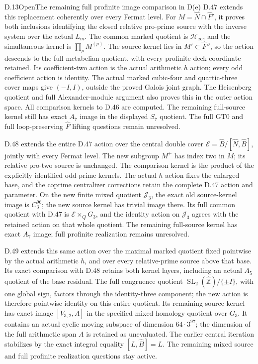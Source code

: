 \begin{statement}{D.13}{Open}{The remaining full profinite image comparison in D(e)}
D.47 extends this replacement coherently over every Fermat level.
For \(M=\widehat N\cap\widehat F'\), it proves both inclusions
identifying the closed relative pro-prime source with the inverse
system over the actual \(L_m\). The common marked quotient is
\(\mathcal H_\infty\), and the simultaneous kernel is
\(\prod_pM^{(p)}\). The source kernel lies in \(M'\subset
\widehat F''\), so the action descends to the full metabelian
quotient, with every profinite deck coordinate retained. Its
coefficient-two action is the actual arithmetic \(h\) action;
every odd coefficient action is identity. The actual marked
cubic-four and quartic-three cover maps give \((-I,I)\), outside
the proved Galois joint graph. The Heisenberg quotient and full
Alexander-module argument also proves this in the outer action
space. All comparison kernels to D.46 are computed. The remaining
full-source kernel still has exact \(A_7\) image in the displayed
\(S_7\) quotient. The full GT0 and full loop-preserving
\(\widehat F\) lifting questions remain unresolved.

D.48 extends the entire D.47 action over the central double cover
\(\mathcal E=\widehat B/[\widehat N,\widehat B]\), jointly with
every Fermat level. The new subgroup \(M^+\) has index two in
\(M\); its relative pro-two source is unchanged. The comparison
kernel is the product of the explicitly identified odd-prime
kernels. The actual \(h\) action fixes the enlarged base, and
the coprime centralizer corrections retain the complete D.47
action and parameter. On the new finite mixed quotient
\(\mathcal J_3\), the exact old source-kernel image is
\(C_3^{96}\); the new source kernel has trivial image there.
Its full common quotient with D.47 is
\(\mathcal E\times_QG_3\), and the identity action on
\(\mathcal J_3\) agrees with the retained action on that whole
quotient. The remaining full-source kernel has exact
\(A_7\) image; full profinite realization remains unresolved.


D.49 extends this same action over the maximal marked quotient
fixed pointwise by the actual arithmetic \(h\), and over every
relative-prime source above that base. Its exact comparison
with D.48 retains both kernel layers, including an actual
\(A_5\) quotient of the base residual. The full congruence
quotient \(\operatorname{SL}_2(\widehat{\mathbb Z})/\{\pm I\}\),
with one global sign, factors through the identity-three
component; the new action is therefore pointwise identity
on this entire quotient. Its remaining source kernel has
exact image \([V_{3,2},A]\) in the specified mixed homology
quotient over \(G_3\). It contains an actual cyclic moving
subspace of dimension \(64\cdot3^{97}\); the dimension
of the full arithmetic span \(A\) is retained as unevaluated.
The earlier central iteration stabilizes by the exact
integral equality \([L,\widehat B]=L\).
The remaining mixed source and full profinite realization
questions stay active.



\end{statement}
